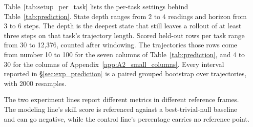 Table~\ref{tab:setup_per_task} lists the per-task settings behind Table~\ref{tab:prediction}.
State depth ranges from 2 to 4 readings and horizon from 3 to 6 steps.
The depth is the deepest state that still leaves a rollout of at least three steps on that task's trajectory length.  %
Scored held-out rows per task range from 30 to 12,376, counted after windowing.  %
The trajectories those rows come from number 10 to 100 for the seven columns of Table~\ref{tab:prediction}, and 4 to 30 for the columns of Appendix~\ref{app:A2_small_columns}.  %
Every interval reported in \S\ref{sec:exp_prediction} is a paired grouped bootstrap over trajectories, with 2000 resamples. 

The two experiment lines report different metrics in different reference frames.  %
The modeling line's skill score is referenced against a best-trivial-null baseline and can go negative, while the control line's percentage carries no reference point.

